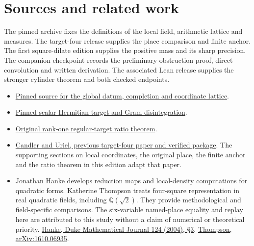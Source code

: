 \documentclass[12pt,letterpaper]{article}
\begin{document}
\section*{Sources and related work}
The pinned archive fixes the definitions of the local field, arithmetic lattice and measures. The target-four release supplies the place comparison and finite anchor. The first square-dilate edition supplies the positive mass and its sharp precision. The companion checkpoint records the preliminary obstruction proof, direct convolution and written derivation. The associated Lean release supplies the stronger cylinder theorem and both checked endpoints.
\begin{itemize}
\item \href{https://github.com/nousentllc/riemann-hypothesis/blob/40e56bab026552e089d7afcfeff08d2defb9c005/src/Formalism/SharpRestriction/GlobalSchurBounds/GeneralLinearActions/GenusMassVolumes.lean}{Pinned source for the global datum, completion and coordinate lattice}.
\item \href{https://github.com/nousentllc/riemann-hypothesis/blob/40e56bab026552e089d7afcfeff08d2defb9c005/src/CompanionTheory/SpectralGeometry/CountingDefinitions/AdelicEulerProducts/IsEulerProd.lean}{Pinned scalar Hermitian target and Gram disintegration}.
\item \href{https://github.com/nousentllc/riemann-hypothesis/blob/40e56bab026552e089d7afcfeff08d2defb9c005/src/CompanionTheory/SpectralGeometry/LocalGlobalProofs/AdelicAnalysis/LocalGramFiberRankOneSetFormula.lean#L310}{Original rank-one regular-target ratio theorem}.
\item \href{https://github.com/nousentllc/riemann-hypothesis/tree/63c06fe44eb700e4550e4a2b70adafe09cb1ff9b/research/uriel/experiments/ramified-gram-bridge}{Candler and Uriel, previous target-four paper and verified package}. The supporting sections on local coordinates, the original place, the finite anchor and the ratio theorem in this edition adapt that paper.
\item Jonathan Hanke develops reduction maps and local-density computations for quadratic forms. Katherine Thompson treats four-square representation in real quadratic fields, including $\mathbb Q(\sqrt2)$. They provide methodological and field-specific comparisons. The six-variable named-place equality and replay here are attributed to this study without a claim of numerical or theoretical priority. \href{https://www.jonhanke.com/Hanke--all_papers__as_of_2015-01-14/explicit-bounds-paper.pdf}{Hanke, Duke Mathematical Journal 124 (2004), §3}. \href{https://arxiv.org/abs/1610.06935}{Thompson, arXiv:1610.06935}.

\end{itemize}
\end{document}
